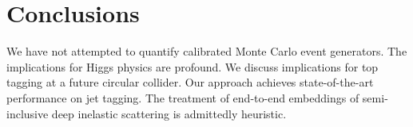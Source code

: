 \section{Conclusions}\label{sec:conclusions}

We have not attempted to quantify calibrated Monte Carlo event
generators. The implications for Higgs physics are profound. We discuss
implications for top tagging at a future circular collider. Our approach
achieves state-of-the-art performance on jet tagging. The treatment of
end-to-end embeddings of semi-inclusive deep inelastic scattering is
admittedly heuristic.

